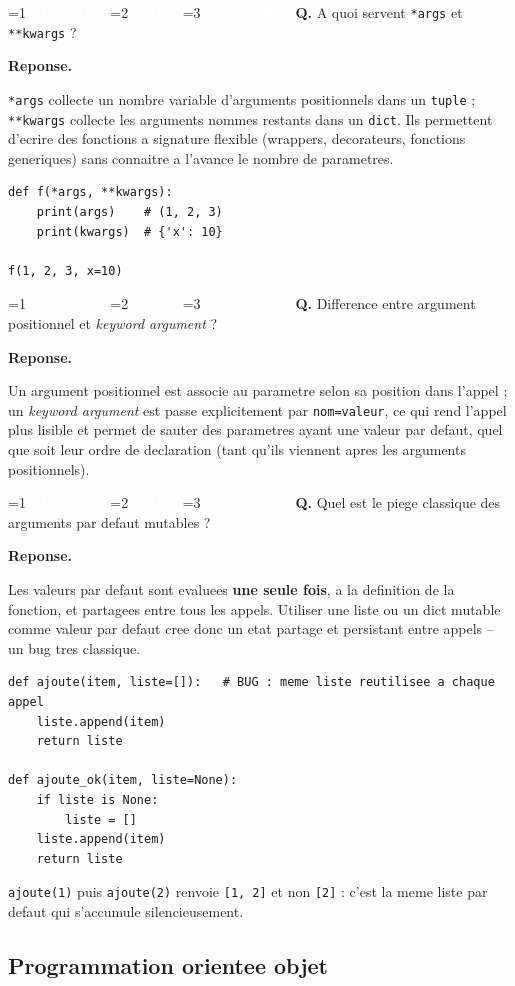 \documentclass[11pt,a4paper]{article}
\newcommand{\badgeJ}{\textcolor{white}{\colorbox{junior}{\small\bfseries\ JUNIOR\ }}}
\newcommand{\badgeM}{\textcolor{white}{\colorbox{mid}{\small\bfseries\ MID\ }}}
\newcommand{\badgeS}{\textcolor{white}{\colorbox{senior}{\small\bfseries\ SENIOR\ }}}
\newcounter{qcount}
\newenvironment{qa}[2]{%
  \stepcounter{qcount}%
  \par\vspace{6pt}%
  \noindent\colorbox{qbg}{\parbox{\dimexpr\linewidth-12pt}{\vspace{2pt}%
  \ifnum#1=1 \badgeJ\fi\ifnum#1=2 \badgeM\fi\ifnum#1=3 \badgeS\fi
  \ \textbf{Q\theqcount.} #2\vspace{2pt}}}\par\vspace{4pt}%
  \noindent\textbf{\color{accent}Reponse.}\ \ignorespaces
}{%
  \par\vspace{8pt}%
}
\begin{document}
\begin{qa}{1}{A quoi servent \texttt{*args} et \texttt{**kwargs} ?}
\texttt{*args} collecte un nombre variable d'arguments positionnels dans un
\texttt{tuple} ; \texttt{**kwargs} collecte les arguments nommes restants dans
un \texttt{dict}. Ils permettent d'ecrire des fonctions a signature flexible
(wrappers, decorateurs, fonctions generiques) sans connaitre a l'avance le
nombre de parametres.
\begin{lstlisting}
def f(*args, **kwargs):
    print(args)    # (1, 2, 3)
    print(kwargs)  # {'x': 10}

f(1, 2, 3, x=10)
\end{lstlisting}
\end{qa}

\begin{qa}{1}{Difference entre argument positionnel et \emph{keyword argument} ?}
Un argument positionnel est associe au parametre selon sa position dans
l'appel ; un \emph{keyword argument} est passe explicitement par
\texttt{nom=valeur}, ce qui rend l'appel plus lisible et permet de sauter des
parametres ayant une valeur par defaut, quel que soit leur ordre de
declaration (tant qu'ils viennent apres les arguments positionnels).
\end{qa}

\begin{qa}{2}{Quel est le piege classique des arguments par defaut mutables ?}
Les valeurs par defaut sont evaluees \textbf{une seule fois}, a la definition
de la fonction, et partagees entre tous les appels. Utiliser une liste ou un
dict mutable comme valeur par defaut cree donc un etat partage et persistant
entre appels -- un bug tres classique.
\begin{lstlisting}
def ajoute(item, liste=[]):   # BUG : meme liste reutilisee a chaque appel
    liste.append(item)
    return liste

def ajoute_ok(item, liste=None):
    if liste is None:
        liste = []
    liste.append(item)
    return liste
\end{lstlisting}
\begin{piege}
\texttt{ajoute(1)} puis \texttt{ajoute(2)} renvoie \texttt{[1, 2]} et non
\texttt{[2]} : c'est la meme liste par defaut qui s'accumule silencieusement.
\end{piege}
\end{qa}

\subsection{Programmation orientee objet}
\end{document}
